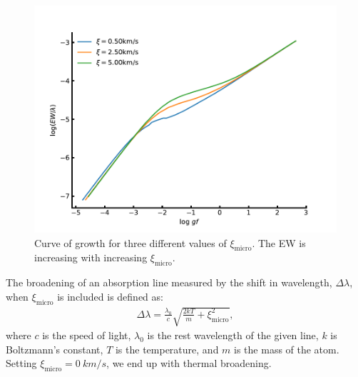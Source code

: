 \begin{figure}[htpb!]
    \centering
    \includegraphics[width=0.85\linewidth]{figures/cog_vt.pdf}
    \caption{Curve of growth for three different values of $\xi_\mathrm{micro}$. The EW is
             increasing with increasing $\xi_\mathrm{micro}$.}
    \label{fig:cog_vt}
\end{figure}

The broadening of an absorption line measured by the shift in wavelength, $\Delta\lambda$, when
$\xi_\mathrm{micro}$ is included is defined as:
\begin{align}
  \Delta\lambda = \frac{\lambda_0}{c} \sqrt{\frac{2kT}{m} + \xi_\mathrm{micro}^2},
\end{align}
where $c$ is the speed of light, $\lambda_0$ is the rest wavelength of the given line, $k$ is
Boltzmann's constant, $T$ is the temperature, and $m$ is the mass of the atom. Setting
$\xi_\mathrm{micro}=\SI{0}{km/s}$, we end up with thermal broadening.


